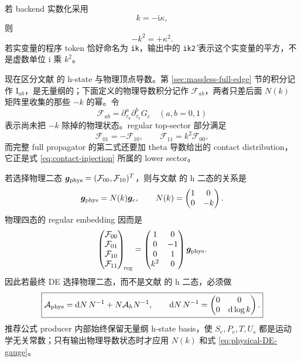 \documentclass[11pt,a4paper]{ctexart}
\newcommand{\dd}{\mathrm d}
\newcommand{\ii}{\mathrm i}
\begin{document}
若 backend 实数化采用
\begin{equation}
 k=-\ii\kappa,
\end{equation}
则
\begin{equation}
 -k^2=+\kappa^2.
\end{equation}
若实变量的程序 token 恰好命名为 \texttt{ik}，输出中的 \texttt{ik\^2} 表示这个实变量的平方，不是虚数单位 $\ii$ 乘 $k^2$。

现在区分文献 \cite{Chen:2023eic} 的 h-state 与物理顶点导数。第 \ref{sec:massless-full-edge} 节的积分记作 $\text{I}_{ab}$，是无量纲的；下面定义的物理导数积分记作 $\mathcal F_{ab}$，两者只差后面 $N(k)$ 矩阵里收集的那些 $-k$ 的幂。令
\begin{equation}
 \mathcal F_{ab}
 =\partial_{\tau_u}^{a}\partial_{\tau_v}^{b}G_e
 \quad(a,b=0,1)
\end{equation}
表示尚未把 $-k$ 除掉的物理状态。regular top-sector 部分满足
\begin{equation}
 \mathcal F_{01}=-\mathcal F_{10},
 \qquad
 \mathcal F_{11}=k^2\mathcal F_{00},
 \label{eq:physical-massless-relations}
\end{equation}
而完整 full propagator 的第二式还要加 theta 导数给出的 contact distribution，它正是式 \eqref{eq:contact-injection} 所属的 lower sector。

若选择物理二态 $\bm g_{\rm phys}=(\mathcal F_{00},\mathcal F_{10})^T$，则与文献 \cite{Chen:2023eic} 的 h 二态的关系是
\begin{equation}
 \bm g_{\rm phys}=N(k)\bm g_e,
 \qquad
 N(k)=\begin{pmatrix}1&0\\0&-k\end{pmatrix}.
 \label{eq:physical-basis-N}
\end{equation}
物理四态的 regular embedding 因而是
\begin{equation}
 \begin{pmatrix}
 \mathcal F_{00}\\\mathcal F_{01}\\\mathcal F_{10}\\\mathcal F_{11}
 \end{pmatrix}_{\!\rm reg}
 =
 \begin{pmatrix}
 1&0\\
 0&-1\\
 0&1\\
 k^2&0
 \end{pmatrix}
 \bm g_{\rm phys}.
 \label{eq:physical-four-to-two}
\end{equation}
因此若最终 DE 选择物理二态，而不是文献 \cite{Chen:2023eic} 的 h 二态，必须做
\begin{equation}
 \boxed{
 \mathcal A_{\rm phys}
 =\dd N\,N^{-1}+N\mathcal A_hN^{-1},
 \qquad
 \dd N\,N^{-1}
 =\begin{pmatrix}0&0\\0&\dd\log k\end{pmatrix}.
 }
 \label{eq:physical-DE-gauge}
\end{equation}
推荐公式 producer 内部始终保留无量纲 h-state basis，使 $S_e,P_e,T,U_s$ 都是运动学无关常数；只有输出物理导数状态时才应用 $N(k)$ 和式 \eqref{eq:physical-DE-gauge}。
\end{document}
